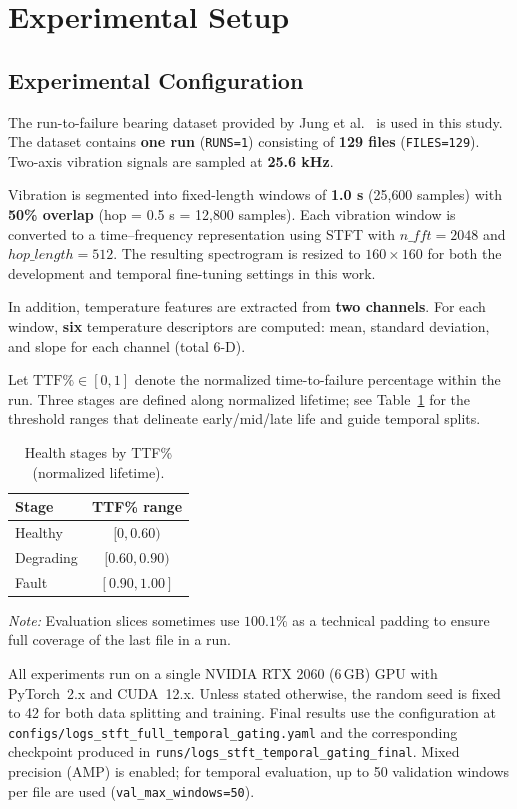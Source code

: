 \documentclass[pdflatex,sn-mathphys-num]{sn-jnl}%
\begin{document}
\section{Experimental Setup}
\label{sec:exp_setup}

\subsection{Experimental Configuration}
The run-to-failure bearing dataset provided by Jung et al.~\cite{jung2024dib_rtf,jung2024mendeley_rtf} is used in this study. 
The dataset contains \textbf{one run} (\texttt{RUNS=1}) consisting of \textbf{129 files} (\texttt{FILES=129}). 
Two-axis vibration signals are sampled at \textbf{25.6 kHz}.

Vibration is segmented into fixed-length windows of \textbf{1.0 s} (25{,}600 samples) with \textbf{50\% overlap} (hop = 0.5 s = 12{,}800 samples). 
Each vibration window is converted to a time--frequency representation using STFT with $n\_fft=2048$ and $hop\_length=512$. 
The resulting spectrogram is resized to \textbf{$160\times160$} for both the development and temporal fine-tuning settings in this work.

In addition, temperature features are extracted from \textbf{two channels}. 
For each window, \textbf{six} temperature descriptors are computed: mean, standard deviation, and slope for each channel (total 6-D).

Let $\mathrm{TTF\%} \in [0,1]$ denote the normalized time-to-failure percentage within the run. 
Three stages are defined along normalized lifetime; see Table~\ref{tab:stages} for the threshold ranges that delineate early/mid/late life and guide temporal splits.
\begin{table}[t]
  \centering
  \caption{Health stages by TTF\% (normalized lifetime).}
  \label{tab:stages}
  \begin{tabular}{lc}
    \toprule
    Stage & TTF\% range \\
    \midrule
    Healthy & $[0,0.60)$ \\
    Degrading & $[0.60,0.90)$ \\
    Fault & $[0.90,1.00]$ \\
    \bottomrule
  \end{tabular}
\end{table}
\noindent\textit{Note:} Evaluation slices sometimes use $100.1\%$ as a technical padding to ensure full coverage of the last file in a run.

All experiments run on a single NVIDIA RTX 2060 (6\,GB) GPU with PyTorch~2.x and CUDA~12.x. Unless stated otherwise, the random seed is fixed to 42 for both data splitting and training. Final results use the configuration at \verb|configs/logs_stft_full_temporal_gating.yaml| and the corresponding checkpoint produced in \verb|runs/logs_stft_temporal_gating_final|. Mixed precision (AMP) is enabled; for temporal evaluation, up to 50 validation windows per file are used (\verb|val_max_windows=50|).
\end{document}
